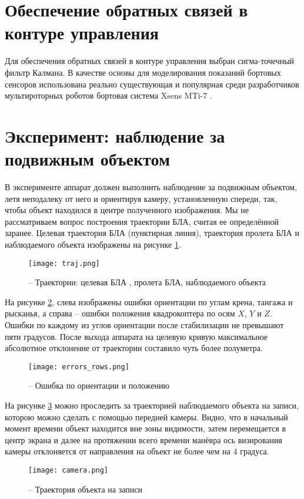 \section{Обеспечение обратных связей в контуре управления}

Для обеспечения обратных связей в контуре управления выбран сигма-точечный фильтр Калмана.
В качестве основы для моделирования показаний бортовых сенсоров использована реально существующая и популярная среди разработчиков мультироторных роботов бортовая система Xsens MTi-7 \cite{xsens01}.

\section{Эксперимент: наблюдение за подвижным объектом}

В эксперименте аппарат должен выполнить наблюдение за подвижным объектом, летя неподалеку от него и ориентируя камеру, установленную спереди, так, чтобы объект находился в центре полученного изображения.
Мы не рассматриваем вопрос построения траектории БЛА, считая ее определённой заранее.
Целевая траектория БЛА (пунктирная линия), траектория пролета БЛА и наблюдаемого объекта изображены на рисунке \ref{fig:mau_traj}.
\begin{figure}[H]
	\centering
	\texttt{[image: traj.png]}
	\caption{ -- Траектории: целевая БЛА , пролета БЛА, наблюдаемого объекта}
	\label{fig:mau_traj}
\end{figure}
На рисунке \ref{fig:mau_errors}, слева изображены ошибки ориентации по углам крена, тангажа и рысканья, а справа -- ошибки положения квадрокоптера по осям $X$, $Y$ и $Z$.
Ошибки по каждому из углов ориентации после стабилизации не превышают пяти градусов.
После выхода аппарата на целевую кривую максимальное абсолютное отклонение от траектории составило чуть более полуметра.
\begin{figure}[h!]
	\centering
	\texttt{[image: errors\_rows.png]}
	\caption{ -- Ошибка по ориентации и положению}
	\label{fig:mau_errors}
\end{figure}

На рисунке \ref{fig:mau_cam} можно проследить за траекторией наблюдаемого объекта на записи, которою можно сделать с помощью передней камеры.
Видно, что в начальный момент времени объект находится вне зоны видимости, затем перемещается в центр экрана и далее на протяжении всего времени манёвра ось визирования камеры отклоняется от направления на объект не более чем на 4 градуса.
\begin{figure}[h!]
	\centering
	\texttt{[image: camera.png]}
	\caption{ -- Траектория объекта на записи}
	\label{fig:mau_cam}
\end{figure}


